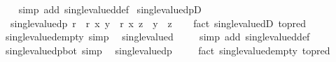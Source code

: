 \begin{isabellebody}
%
\isadelimproof
\ \ %
\endisadelimproof
%
\isatagproof
{}\isamarkupfalse%
\ {\isacharparenleft}{\kern0pt}simp\ add{\isacharcolon}{\kern0pt}\ single{\isacharunderscore}{\kern0pt}valued{\isacharunderscore}{\kern0pt}def{\isacharparenright}{\kern0pt}%
\endisatagproof
{\isafoldproof}%
%
\isadelimproof
\isanewline
%
\endisadelimproof
\isanewline
{}\isamarkupfalse%
\ single{\isacharunderscore}{\kern0pt}valuedpD{\isacharcolon}{\kern0pt}\isanewline
\ \ {\isachardoublequoteopen}single{\isacharunderscore}{\kern0pt}valuedp\ r\ {\isasymLongrightarrow}\ r\ x\ y\ {\isasymLongrightarrow}\ r\ x\ z\ {\isasymLongrightarrow}\ y\ {\isacharequal}{\kern0pt}\ z{\isachardoublequoteclose}\isanewline
%
\isadelimproof
\ \ %
\endisadelimproof
%
\isatagproof
{}\isamarkupfalse%
\ {\isacharparenleft}{\kern0pt}fact\ single{\isacharunderscore}{\kern0pt}valuedD\ {\isacharbrackleft}{\kern0pt}to{\isacharunderscore}{\kern0pt}pred{\isacharbrackright}{\kern0pt}{\isacharparenright}{\kern0pt}%
\endisatagproof
{\isafoldproof}%
%
\isadelimproof
\isanewline
%
\endisadelimproof
\isanewline
{}\isamarkupfalse%
\ single{\isacharunderscore}{\kern0pt}valued{\isacharunderscore}{\kern0pt}empty\ {\isacharbrackleft}{\kern0pt}simp{\isacharbrackright}{\kern0pt}{\isacharcolon}{\kern0pt}\isanewline
\ \ {\isachardoublequoteopen}single{\isacharunderscore}{\kern0pt}valued\ {\isacharbraceleft}{\kern0pt}{\isacharbraceright}{\kern0pt}{\isachardoublequoteclose}\isanewline
%
\isadelimproof
\ \ %
\endisadelimproof
%
\isatagproof
{}\isamarkupfalse%
\ {\isacharparenleft}{\kern0pt}simp\ add{\isacharcolon}{\kern0pt}\ single{\isacharunderscore}{\kern0pt}valued{\isacharunderscore}{\kern0pt}def{\isacharparenright}{\kern0pt}%
\endisatagproof
{\isafoldproof}%
%
\isadelimproof
\isanewline
%
\endisadelimproof
\isanewline
{}\isamarkupfalse%
\ single{\isacharunderscore}{\kern0pt}valuedp{\isacharunderscore}{\kern0pt}bot\ {\isacharbrackleft}{\kern0pt}simp{\isacharbrackright}{\kern0pt}{\isacharcolon}{\kern0pt}\isanewline
\ \ {\isachardoublequoteopen}single{\isacharunderscore}{\kern0pt}valuedp\ {\isasymbottom}{\isachardoublequoteclose}\isanewline
%
\isadelimproof
\ \ %
\endisadelimproof
%
\isatagproof
{}\isamarkupfalse%
\ {\isacharparenleft}{\kern0pt}fact\ single{\isacharunderscore}{\kern0pt}valued{\isacharunderscore}{\kern0pt}empty\ {\isacharbrackleft}{\kern0pt}to{\isacharunderscore}{\kern0pt}pred{\isacharbrackright}{\kern0pt}{\isacharparenright}{\kern0pt}%
\endisatagproof
{\isafoldproof}%
%
\isadelimproof
\isanewline
%
\endisadelimproof

\end{isabellebody}
